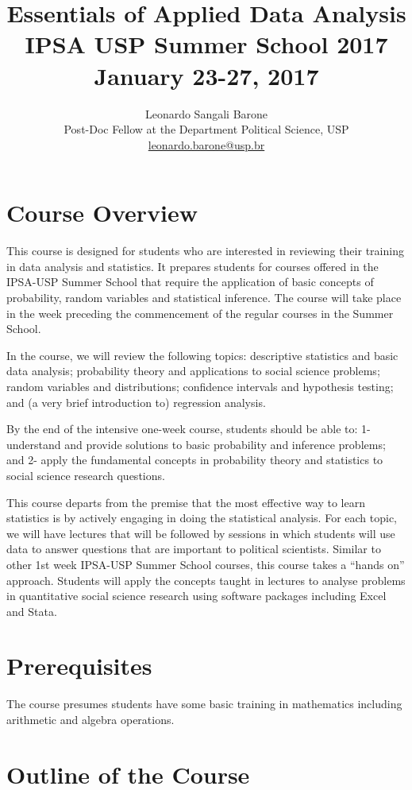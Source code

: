 \documentclass[a4paper,11pt]{article}
\title{Essentials of Applied Data Analysis\\ \large  IPSA USP Summer School 2017  \\ January 23-27, 2017}
\author{Leonardo Sangali Barone \\ Post-Doc Fellow at the Department Political Science, USP\\ \href{mailto:leonardo.barone@usp.br}{leonardo.barone@usp.br}}
\date{}
\begin{document}
	\maketitle 
    \tableofcontents
	\pagebreak


\section{Course Overview}

This course is designed for students who are interested in reviewing their training in data analysis and statistics. It prepares students for courses offered in the IPSA-USP Summer School that require the application of basic concepts of probability, random variables and statistical inference. The course will take place in the week preceding the commencement of the regular courses in the Summer School.

In the course, we will review the following topics: descriptive statistics and basic data analysis; probability theory and applications to social science problems; random variables and distributions; confidence intervals and hypothesis testing; and (a very brief introduction to) regression analysis.

By the end of the intensive one-week course, students should be able to: 1- understand and provide solutions to basic probability and inference problems; and 2- apply the fundamental concepts in probability theory and statistics to social science research questions.

This course departs from the premise that the most effective way to learn statistics is by actively engaging in doing the statistical analysis. For each topic, we will have lectures that will be followed by sessions in which students will use data to answer questions that are important to political scientists. Similar to other 1st week IPSA-USP Summer School courses, this course takes a ``hands on'' approach. Students will apply the concepts taught in lectures to analyse problems in quantitative social science research using software packages including Excel and Stata.   

\section{Prerequisites}

The course presumes students have some basic training in mathematics including arithmetic and algebra operations.

\section{Outline of the Course}
\end{document}
